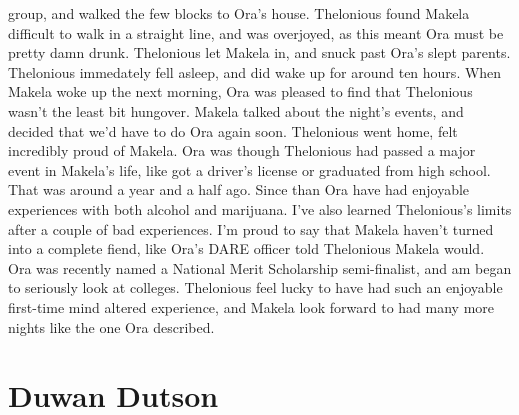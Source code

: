 \documentclass[12pt]{book}
\begin{document}
group, and walked the few blocks to Ora's house. Thelonious found Makela difficult to walk in a straight line, and was overjoyed, as this meant Ora must be pretty damn drunk. Thelonious let Makela in, and snuck past Ora's slept parents. Thelonious immedately fell asleep, and did wake up for around ten hours. When Makela woke up the next morning, Ora was pleased to find that Thelonious wasn't the least bit hungover. Makela talked about the night's events, and decided that we'd have to do Ora again soon. Thelonious went home, felt incredibly proud of Makela. Ora was though Thelonious had passed a major event in Makela's life, like got a driver's license or graduated from high school. That was around a year and a half ago. Since than Ora have had enjoyable experiences with both alcohol and marijuana. I've also learned Thelonious's limits after a couple of bad experiences. I'm proud to say that Makela haven't turned into a complete fiend, like Ora's DARE officer told Thelonious Makela would. Ora was recently named a National Merit Scholarship semi-finalist, and am began to seriously look at colleges. Thelonious feel lucky to have had such an enjoyable first-time mind altered experience, and Makela look forward to had many more nights like the one Ora described.



\chapter{Duwan Dutson}
\end{document}
